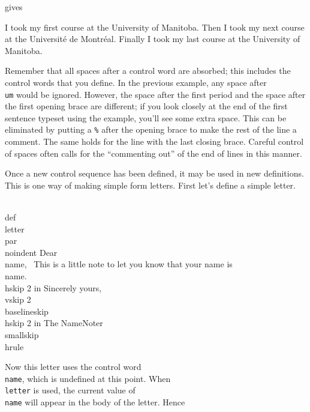 \noindent gives \medskip 

\def\um{University of Manitoba} 
I took my first course at the \um. 
{ 
\def\um{Universit\'e de Montr\'eal} 
Then I took my next course at the \um. 
} 
Finally I took my last course at the \um. 

Remember that all spaces after a control word are absorbed; this 
includes the control words that you define. In the previous 
example, any space after {\tt \\um} would be ignored. However, 
the space after the first period and the space after the first 
opening brace are different; if you look closely at the end of 
the first sentence typeset using the example, you'll see some 
extra space. This can be eliminated by putting a {\tt \%} after 
the opening brace to make the rest of the line a comment. The 
same holds for the line with the last closing brace. Careful 
control of spaces often calls for the ``commenting out'' of the 
end of lines in this manner. 

Once a new control sequence has been defined, it may be used in 
new definitions. This is one way of making simple form letters. 
First let's define a simple letter. 

\beginuser 
\\def\\letter\lb 
\\par \\noindent 
Dear \\name, 
\ 
This is a little note to let you know that your name is \\name. 
\ 
\\hskip 2 in Sincerely yours, 
\\vskip 2\\baselineskip 
\\hskip 2 in The NameNoter 
\\smallskip \\hrule 
\rb 
\enduser 

\def\letter{ 
\par \noindent 
Dear \name, 

This is a little note to let you know that your name is \name. 

\hskip 2 in Sincerely yours, 
\vskip 2\baselineskip\nobreak 
\hskip 2 in The NameNoter 
\smallskip \hrule 
} 

Now this letter uses the control word {\tt \\name}, which is 
undefined at this point.  When {\tt \\letter} is used, the 
current value of {\tt \\name} will appear in the body of the 
letter. Hence 

